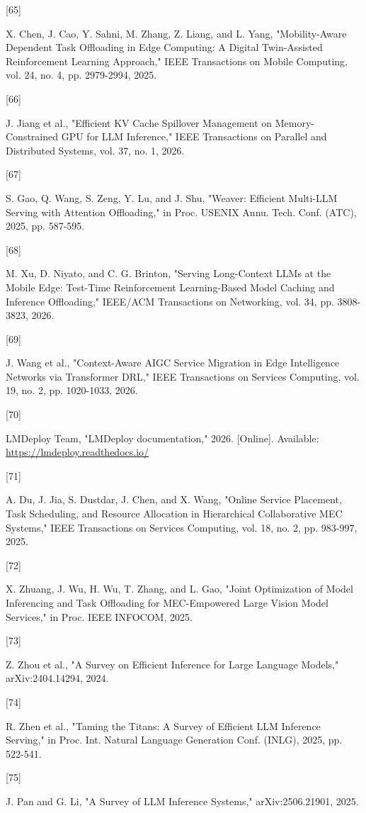 \hypertarget{ref:65}{[65]} X. Chen, J. Cao, Y. Sahni, M. Zhang, Z. Liang, and L. Yang, "Mobility-Aware Dependent Task Offloading in Edge Computing: A Digital Twin-Assisted Reinforcement Learning Approach," IEEE Transactions on Mobile Computing, vol. 24, no. 4, pp. 2979-2994, 2025.

\hypertarget{ref:66}{[66]} J. Jiang et al., "Efficient KV Cache Spillover Management on Memory-Constrained GPU for LLM Inference," IEEE Transactions on Parallel and Distributed Systems, vol. 37, no. 1, 2026.

\hypertarget{ref:67}{[67]} S. Gao, Q. Wang, S. Zeng, Y. Lu, and J. Shu, "Weaver: Efficient Multi-LLM Serving with Attention Offloading," in Proc. USENIX Annu. Tech. Conf. (ATC), 2025, pp. 587-595.

\hypertarget{ref:68}{[68]} M. Xu, D. Niyato, and C. G. Brinton, "Serving Long-Context LLMs at the Mobile Edge: Test-Time Reinforcement Learning-Based Model Caching and Inference Offloading," IEEE/ACM Transactions on Networking, vol. 34, pp. 3808-3823, 2026.

\hypertarget{ref:69}{[69]} J. Wang et al., "Context-Aware AIGC Service Migration in Edge Intelligence Networks via Transformer DRL," IEEE Transactions on Services Computing, vol. 19, no. 2, pp. 1020-1033, 2026.


\hypertarget{ref:70}{[70]} LMDeploy Team, "LMDeploy documentation," 2026. [Online]. Available: \href{https://lmdeploy.readthedocs.io/}{\url{https://lmdeploy.readthedocs.io/}}

\hypertarget{ref:71}{[71]} A. Du, J. Jia, S. Dustdar, J. Chen, and X. Wang, "Online Service Placement, Task Scheduling, and Resource Allocation in Hierarchical Collaborative MEC Systems," IEEE Transactions on Services Computing, vol. 18, no. 2, pp. 983-997, 2025.

\hypertarget{ref:72}{[72]} X. Zhuang, J. Wu, H. Wu, T. Zhang, and L. Gao, "Joint Optimization of Model Inferencing and Task Offloading for MEC-Empowered Large Vision Model Services," in Proc. IEEE INFOCOM, 2025.

\hypertarget{ref:73}{[73]} Z. Zhou et al., "A Survey on Efficient Inference for Large Language Models," arXiv:2404.14294, 2024.

\hypertarget{ref:74}{[74]} R. Zhen et al., "Taming the Titans: A Survey of Efficient LLM Inference Serving," in Proc. Int. Natural Language Generation Conf. (INLG), 2025, pp. 522-541.

\hypertarget{ref:75}{[75]} J. Pan and G. Li, "A Survey of LLM Inference Systems," arXiv:2506.21901, 2025.






